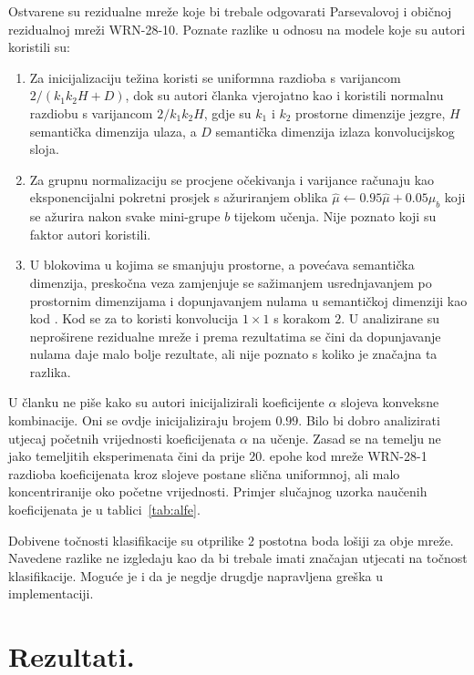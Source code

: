 \documentclass[utf8, seminar, numeric, lmodern]{feri}
\begin{document}
Ostvarene su rezidualne mreže koje bi trebale odgovarati Parsevalovoj i običnoj rezidualnoj mreži WRN-28-10. Poznate razlike u odnosu na modele koje su autori koristili su:
\begin{enumerate}
\item Za inicijalizaciju težina koristi se uniformna razdioba s varijancom $2/(k_1k_2H+D)$, dok su autori članka vjerojatno kao i \cite{zagoruyko16-wrn} koristili normalnu razdiobu s varijancom $2/k_1k_2H$, gdje su $k_1$ i $k_2$ prostorne dimenzije jezgre, $H$ semantička dimenzija ulaza, a $D$ semantička dimenzija izlaza konvolucijskog sloja.
\item Za grupnu normalizaciju se procjene očekivanja i varijance računaju kao eksponencijalni pokretni prosjek s ažuriranjem oblika $\hat{\mu}\gets0.95\hat{\mu}+0.05\mu_b$ koji se ažurira nakon svake mini-grupe $b$ tijekom učenja. Nije poznato koji su faktor autori koristili.
\item U blokovima u kojima se smanjuju prostorne, a povećava semantička dimenzija, preskočna veza zamjenjuje se sažimanjem usrednjavanjem po prostornim dimenzijama i dopunjavanjem nulama u semantičkoj dimenziji kao kod \cite{he15-resnet, he16-resnet-imdrn}. Kod \cite{zagoruyko16-wrn} se za to koristi konvolucija $1\times1$ s korakom $2$. U \cite{he16-resnet-imdrn} analizirane su neproširene rezidualne mreže i prema rezultatima se čini da dopunjavanje nulama daje malo bolje rezultate, ali nije poznato s koliko je značajna ta razlika.
\end{enumerate}
U članku ne piše kako su autori inicijalizirali koeficijente $\alpha$ slojeva konveksne kombinacije. Oni se ovdje inicijaliziraju brojem $0.99$. Bilo bi dobro analizirati utjecaj početnih vrijednosti koeficijenata $\alpha$ na učenje. Zasad se na temelju ne jako temeljitih eksperimenata čini da prije $20.$ epohe kod mreže WRN-28-1 razdioba koeficijenata kroz slojeve postane slična uniformnoj, ali malo koncentriranije oko početne vrijednosti. Primjer slučajnog uzorka naučenih koeficijenata je u tablici~\ref{tab:alfe}. %

Dobivene točnosti klasifikacije su otprilike $2$ postotna boda lošiji za obje mreže. Navedene razlike ne izgledaju kao da bi trebale imati značajan utjecati na točnost klasifikacije. Moguće je i da je negdje drugdje napravljena greška u implementaciji.


\section{Rezultati.} 
\end{document}
